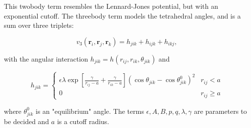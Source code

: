This twobody term resembles the Lennard-Jones potential,
but with an exponential cutoff.
The threebody term models the tetrahedral angles,
and is a sum over three triplets:

\begin{equation}
    v_3(\bm{r}_i, \bm{r}_j, \bm{r}_k) = h_{jik} + h_{ijk} + h_{ikj} ,
\end{equation}

with the angular interaction $h_{jik} = h(r_{ij}, r_{ik}, \theta_{jik})$ and

\begin{equation}
    h_{jik} =
    \begin{cases}
        \displaystyle\epsilon \lambda \exp \left[ \frac{\gamma}{r_{ij} - a}
        + \frac{\gamma}{r_{ik} - a} \right]
        \left(\cos{\theta_{jik}} - \cos{\theta_{jik}^0} \right)^2 & r_{ij} < a \\[10pt]
        \displaystyle 0 & r_{ij} \geq a
    \end{cases}
\end{equation}

where $\theta_{jik}^0$ is an "equilibrium" angle.
The terms $\epsilon, A, B, p, q, \lambda, \gamma$ are parameters
to be decided and $a$ is a cutoff radius.
